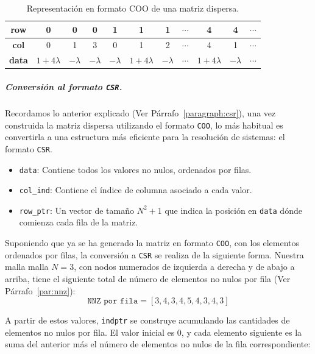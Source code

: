 \documentclass{article}
\begin{document}
\begin{table}[htbp]
\centering
\begin{tabular}{|c|c|c|c|c|c|c|c|c|c|c|}
\hline
\textbf{row} & 0 & 0 & 0 & 1 & 1 & 1 & $\cdots$ & 4 & 4 & $\cdots$\\ 
\hline
\textbf{col} & 0 & 1 & 3 & 0 & 1 & 2 & $\cdots$ & 4 & 1 & $\cdots$ \\
\hline
\textbf{data} & $1 + 4\lambda$ & $-\lambda$ & $-\lambda$ & $-\lambda$ & $1 + 4\lambda$ & $-\lambda$ & $\cdots$ & $1 + 4\lambda$ & $-\lambda$  & $\cdots$ \\
\hline
\end{tabular}
\caption{Representación en formato COO de una matriz dispersa.}
\label{tab:coo_horizontal}
\end{table}

\subparagraph{Conversión al formato \texttt{CSR}.} Recordamos lo anterior explicado (Ver Párrafo~\ref{paragraph:csr}), una vez construida la matriz dispersa utilizando el formato \texttt{COO}, lo más habitual es convertirla a una estructura más eficiente para la resolución de sistemas: el formato \texttt{CSR}. 

\begin{itemize}
    \item \texttt{data}: Contiene todos los valores no nulos, ordenados por filas.
    \item \texttt{col\_ind}: Contiene el índice de columna asociado a cada valor.
    \item \texttt{row\_ptr}: Un vector de tamaño $N^2 + 1$ que indica la posición en \texttt{data} dónde comienza cada fila de la matriz.
\end{itemize}

\noindent Suponiendo que ya se ha generado la matriz en formato \texttt{COO}, con los elementos ordenados por filas, la conversión a \texttt{CSR} se realiza de la siguiente forma. Nuestra malla malla $N=3$, con nodos numerados de izquierda a derecha y de abajo a arriba, tiene el siguiente total de número de elementos no nulos por fila (Ver Párrafo~\ref{par:nnz}):
$$
\texttt{NNZ por fila} = [3,4,3,4,5,4,3,4,3]
$$

A partir de estos valores, \texttt{indptr} se construye acumulando las cantidades de elementos no nulos por fila. El valor inicial es 0, y cada elemento siguiente es la suma del anterior más el número de elementos no nulos de la fila correspondiente:
\end{document}
